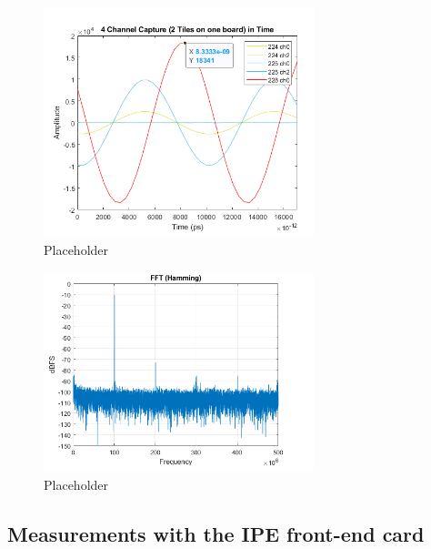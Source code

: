 \begin{figure}[H]
	\centering
	\includegraphics[width = 0.7\textwidth]{chap/04-characterization/img/plot1.png}
	\caption{Placeholder}
	\label{fig:plot1}
\end{figure}
\begin{figure}[H]
	\centering
	\includegraphics[width = 0.7\textwidth]{chap/04-characterization/img/plot2.png}
	\caption{Placeholder}
	\label{fig:plot2}
\end{figure}
\subsection{Measurements with the IPE front-end card}

\newpage
